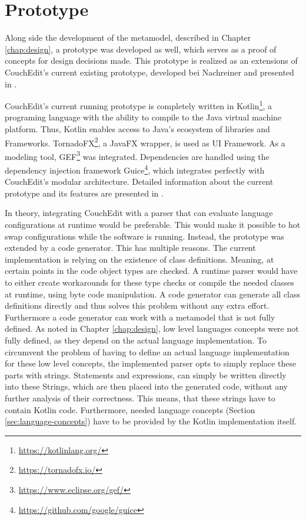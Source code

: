 \chapter{Prototype}
\label{chap:prototype}
Along side the development of the metamodel, described in Chapter \ref{chap:design}, a prototype was developed as well, which serves as a proof of concepts for design decisions made. This prototype is realized as an extensions of CouchEdit's current existing prototype, developed bei Nachreiner and presented in \cite{nachreiner_couchedit_2020}.

CouchEdit's current running prototype is completely written in Kotlin\footnote{\url{https://kotlinlang.org/}}, a programing language with the ability to compile to the Java virtual machine platform. Thus, Kotlin enables access to Java's ecosystem of libraries and Frameworks. TornadoFX\footnote{\url{https://tornadofx.io/}}, a JavaFX wrapper, is used as UI Framework. As a modeling tool, GEF\footnote{\url{https://www.eclipse.org/gef/}} was integrated. Dependencies are handled using the dependency injection framework Guice\footnote{\url{https://github.com/google/guice}}, which integrates perfectly with CouchEdit's modular architecture. Detailed information about the current prototype and its features are presented in \cite{nachreiner_couchedit_2020}.

In theory, integrating CouchEdit with a parser that can evaluate language configurations at runtime would be preferable. This would make it possible to hot swap configurations while the software is running. Instead, the prototype was extended by a code generator. This has multiple reasons. The current implementation is relying on the existence of class definitions. Meaning, at certain points in the code object types are checked. A runtime parser would have to either create workarounds for these type checks or compile the needed classes at runtime, using byte code manipulation. A code generator can generate all class definitions directly and thus solves this problem without any extra effort. Furthermore a code generator can work with a metamodel that is not fully defined. As noted in Chapter \ref{chap:design}, low level languages concepts were not fully defined, as they depend on the actual language implementation. To circumvent the problem of having to define an actual language implementation for these low level concepts, the implemented parser opts to simply replace these parts with strings. Statements and expressions, can simply be written directly into these Strings, which are then placed into the generated code, without any further analysis of their correctness. This means, that these strings have to contain Kotlin code. Furthermore, needed language concepts (Section \ref{sec:language-concepts}) have to be provided by the Kotlin implementation itself.


